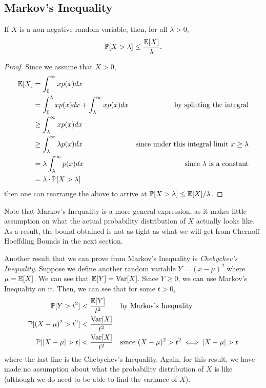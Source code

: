 \documentclass[12pt]{article}
\begin{document}
\subsection{Markov's Inequality}
\begin{theorem} If $X$ is a non-negative random variable, then, for all $\lambda > 0$, $$\mathbb{P} [X > \lambda] \leq \frac{\mathbb{E}[X]}{\lambda}.$$
\end{theorem}
\begin{proof} Since we assume that $X > 0$,
	\begin{align*}
		\mathbb{E}[X] &= \int_{0}^{\infty} x p(x) dx \\
		&=  \int_{0}^{\lambda} x p(x) dx +  \int_{\lambda}^{\infty} x p(x) dx &\textmd{by splitting the integral} \\
		&\geq \int_{\lambda}^{\infty} x p(x) dx \\
		&\geq \int_{\lambda}^{\infty} \lambda p(x) dx &\textmd{since under this integral limit $x \geq \lambda$}\\
		&= \lambda \int_{\lambda}^{\infty} p(x) dx &\textmd{since $\lambda$ is a constant}\\
		&= \lambda \cdot \mathbb{P}[X > \lambda]
	\end{align*}
	then one can rearrange the above to arrive at $\mathbb{P} [X > \lambda] \leq \mathbb{E}[X] / \lambda$.
\end{proof}

Note that Markov's Inequality is a more general expression, as it makes little assumption on what the actual probability distribution of $X$ actually looks like. As a result, the bound obtained is not as tight as what we will get from Chernoff-Hoeffding Bounds in the next section. 

Another result that we can prove from Markov's Inequality is \textit{Chebychev's Inequality}. Suppose we define another random variable $Y = (x - \mu)^2$ where $\mu = \mathbb{E}[X]$. We can see that $\mathbb{E}[Y] = \textmd{Var}[X]$. Since $Y \geq 0$, we can use Markov's Inequality on it. Then, we can see that for some $t > 0$,
\begin{align*}
	\mathbb{P}[Y > t^2] &< \frac{\mathbb{E}[Y]}{t^2} &&\textmd{by Markov's Inequality} \\
	\mathbb{P}[(X-\mu)^2 > t^2] &< \frac{\textmd{Var}[X]}{t^2} && \\
	\mathbb{P}[|X-\mu| > t] &< \frac{\textmd{Var}[X]}{t^2} &&\textmd{since $(X-\mu)^2 > t^2 \iff |X-\mu| > t$} \\
\end{align*}
where the last line is the Chebychev's Inequality. Again, for this result, we have made no assumption about what the probability distribution of $X$ is like (although we do need to be able to find the variance of $X$). 
\end{document}
